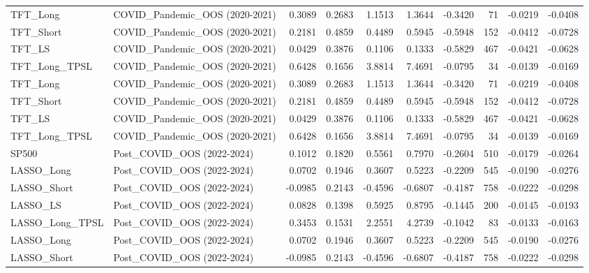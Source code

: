 \begin{tabular}{llrrrrrrrr}
\cline{1-10}
TFT\_Long & COVID\_Pandemic\_OOS (2020-2021) & 0.3089 & 0.2683 & 1.1513 & 1.3644 & -0.3420 & 71 & -0.0219 & -0.0408 \\
\cline{1-10}
TFT\_Short & COVID\_Pandemic\_OOS (2020-2021) & 0.2181 & 0.4859 & 0.4489 & 0.5945 & -0.5948 & 152 & -0.0412 & -0.0728 \\
\cline{1-10}
TFT\_LS & COVID\_Pandemic\_OOS (2020-2021) & 0.0429 & 0.3876 & 0.1106 & 0.1333 & -0.5829 & 467 & -0.0421 & -0.0628 \\
\cline{1-10}
TFT\_Long\_TPSL & COVID\_Pandemic\_OOS (2020-2021) & 0.6428 & 0.1656 & 3.8814 & 7.4691 & -0.0795 & 34 & -0.0139 & -0.0169 \\
\cline{1-10}
TFT\_Long & COVID\_Pandemic\_OOS (2020-2021) & 0.3089 & 0.2683 & 1.1513 & 1.3644 & -0.3420 & 71 & -0.0219 & -0.0408 \\
\cline{1-10}
TFT\_Short & COVID\_Pandemic\_OOS (2020-2021) & 0.2181 & 0.4859 & 0.4489 & 0.5945 & -0.5948 & 152 & -0.0412 & -0.0728 \\
\cline{1-10}
TFT\_LS & COVID\_Pandemic\_OOS (2020-2021) & 0.0429 & 0.3876 & 0.1106 & 0.1333 & -0.5829 & 467 & -0.0421 & -0.0628 \\
\cline{1-10}
TFT\_Long\_TPSL & COVID\_Pandemic\_OOS (2020-2021) & 0.6428 & 0.1656 & 3.8814 & 7.4691 & -0.0795 & 34 & -0.0139 & -0.0169 \\
\cline{1-10}
SP500 & Post\_COVID\_OOS (2022-2024) & 0.1012 & 0.1820 & 0.5561 & 0.7970 & -0.2604 & 510 & -0.0179 & -0.0264 \\
\cline{1-10}
LASSO\_Long & Post\_COVID\_OOS (2022-2024) & 0.0702 & 0.1946 & 0.3607 & 0.5223 & -0.2209 & 545 & -0.0190 & -0.0276 \\
\cline{1-10}
LASSO\_Short & Post\_COVID\_OOS (2022-2024) & -0.0985 & 0.2143 & -0.4596 & -0.6807 & -0.4187 & 758 & -0.0222 & -0.0298 \\
\cline{1-10}
LASSO\_LS & Post\_COVID\_OOS (2022-2024) & 0.0828 & 0.1398 & 0.5925 & 0.8795 & -0.1445 & 200 & -0.0145 & -0.0193 \\
\cline{1-10}
LASSO\_Long\_TPSL & Post\_COVID\_OOS (2022-2024) & 0.3453 & 0.1531 & 2.2551 & 4.2739 & -0.1042 & 83 & -0.0133 & -0.0163 \\
\cline{1-10}
LASSO\_Long & Post\_COVID\_OOS (2022-2024) & 0.0702 & 0.1946 & 0.3607 & 0.5223 & -0.2209 & 545 & -0.0190 & -0.0276 \\
\cline{1-10}
LASSO\_Short & Post\_COVID\_OOS (2022-2024) & -0.0985 & 0.2143 & -0.4596 & -0.6807 & -0.4187 & 758 & -0.0222 & -0.0298 \\
\cline{1-10}

\end{tabular}
